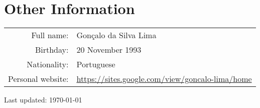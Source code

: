 \documentclass[a4paper,11pt]{article} %
\begin{document}
%


\section[Other Information]{\faInfoCircle \hspace{3pt} Other Information}

\begin{tabular}{rp{15cm}}
	Full name: & Gonçalo da Silva Lima \\
	Birthday: & 20 November 1993 \\
	Nationality: & Portuguese	\\
	Personal website: & \href{https://sites.google.com/view/goncalo-lima/home}{https://sites.google.com/view/goncalo-lima/home} \\
\end{tabular}

\vspace{2cm}
\begin{flushright}
	Last updated: \today \\
\end{flushright}
\end{document}
